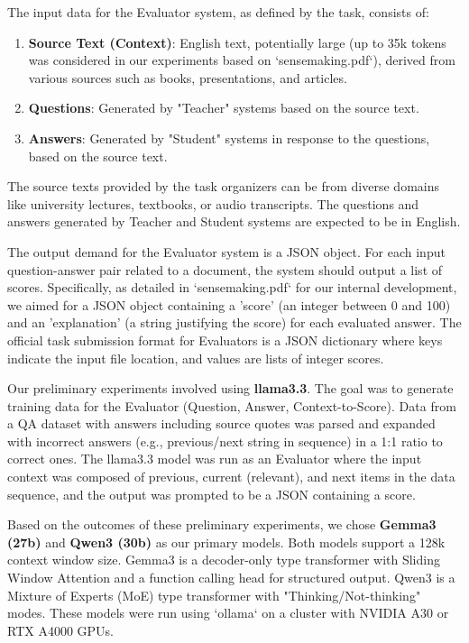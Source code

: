 \documentclass[fleqn,10pt]{olplainarticle}
\begin{document}
The input data for the Evaluator system, as defined by the task, consists of:
\begin{enumerate}
    \item \textbf{Source Text (Context)}: English text, potentially large (up to 35k tokens was considered in our experiments based on `sensemaking.pdf`), derived from various sources such as books, presentations, and articles.
    \item \textbf{Questions}: Generated by "Teacher" systems based on the source text.
    \item \textbf{Answers}: Generated by "Student" systems in response to the questions, based on the source text.
\end{enumerate}
The source texts provided by the task organizers can be from diverse domains like university lectures, textbooks, or audio transcripts. The questions and answers generated by Teacher and Student systems are expected to be in English.

The output demand for the Evaluator system is a JSON object. For each input question-answer pair related to a document, the system should output a list of scores. Specifically, as detailed in `sensemaking.pdf` for our internal development, we aimed for a JSON object containing a 'score' (an integer between 0 and 100) and an 'explanation' (a string justifying the score) for each evaluated answer. The official task submission format for Evaluators is a JSON dictionary where keys indicate the input file location, and values are lists of integer scores.

Our preliminary experiments involved using \textbf{llama3.3}. The goal was to generate training data for the Evaluator (Question, Answer, Context-to-Score). Data from a QA dataset with answers including source quotes was parsed and expanded with incorrect answers (e.g., previous/next string in sequence) in a 1:1 ratio to correct ones. The llama3.3 model was run as an Evaluator where the input context was composed of previous, current (relevant), and next items in the data sequence, and the output was prompted to be a JSON containing a score.

Based on the outcomes of these preliminary experiments, we chose \textbf{Gemma3 (27b)} and \textbf{Qwen3 (30b)} as our primary models. Both models support a 128k context window size. Gemma3 is a decoder-only type transformer with Sliding Window Attention and a function calling head for structured output. Qwen3 is a Mixture of Experts (MoE) type transformer with "Thinking/Not-thinking" modes. These models were run using `ollama` on a cluster with NVIDIA A30 or RTX A4000 GPUs.
\end{document}
